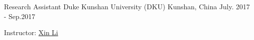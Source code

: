 


\begin{cventries}

%
%

\cventry
{Research Assistant} %
{Duke Kunshan University (DKU)} %
{Kunshan, China} %
{July. 2017 - Sep.2017} %
{ %
\begin{cvitems}
\item {Instructor: \href{http://ece.duke.edu/faculty/xin-li}{Xin Li}}
\end{cvitems}
}


\end{cventries}
